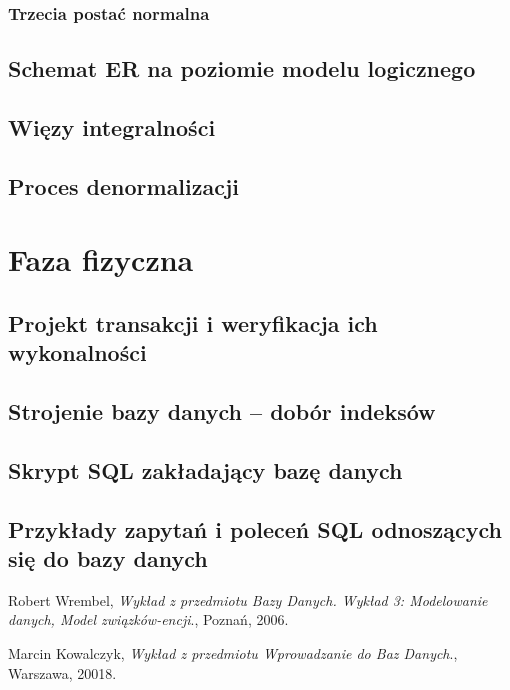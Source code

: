 \documentclass{mwrep}[15pt]
\begin{document}
\subsection{Trzecia postać normalna}


\section{Schemat ER na poziomie modelu logicznego}

\section{Więzy integralności}

\section{Proces denormalizacji}

\chapter{Faza fizyczna}

\section{Projekt transakcji i weryfikacja ich wykonalności}

\section{Strojenie bazy danych – dobór indeksów}

\section{Skrypt SQL zakładający bazę danych}

\section{Przykłady zapytań i poleceń SQL odnoszących się do bazy danych}

\begin{thebibliography}{9}

	

	  Robert Wrembel,
	  \emph{Wykład z przedmiotu Bazy Danych. Wykład 3: Modelowanie danych, Model związków-encji}.,
	  Poznań,
	  2006.

	
	  Marcin Kowalczyk,
	  \emph{Wykład z przedmiotu Wprowadzanie do Baz Danych}.,
	  Warszawa,
	  20018.
	
	\end{thebibliography}
\end{document}
